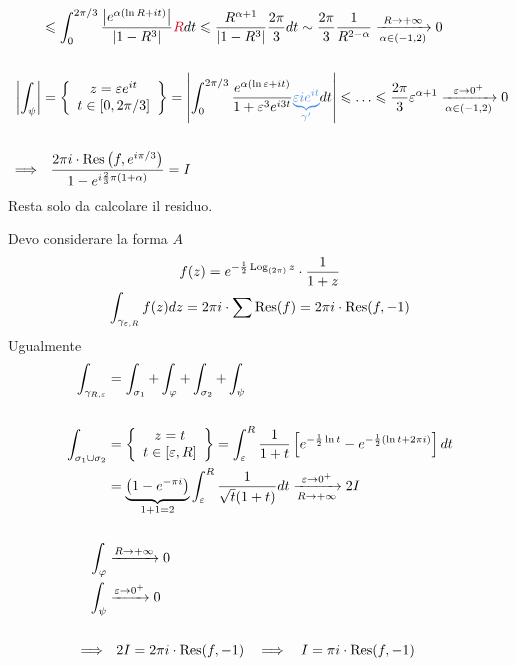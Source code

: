 \begin{equation*}
\begin{aligned}
 & \leqslant \int ^{2\pi /3}_{0}\frac{\left| e^{\alpha (\ln R + it)}\right| }{\left| 1 - R^{3}\right| }\textcolor[rgb]{0.82,0.01,0.11}{R} dt\leqslant \frac{R^{\alpha + 1}}{\left| 1 - R^{3}\right| }\frac{2\pi }{3} dt\sim \frac{2\pi }{3}\frac{1}{R^{2 - \alpha }}\xrightarrow[\alpha \in (- 1,2)]{R\rightarrow + \infty } 0\\
 & \\
\left| \int _{\psi }\right|  & = \left\{\begin{array}{ c }
z = \varepsilon e^{it}\\
t\in [ 0,2\pi /3]
\end{array}\right\} = \left| \int ^{2\pi /3}_{0}\frac{e^{\alpha (\ln \varepsilon + it)}}{1 + \varepsilon ^{3} e^{i3t}}\textcolor[rgb]{0.29,0.56,0.89}{\underbrace{\varepsilon ie^{it}}_{\gamma '}} dt\right| \leqslant \dotsc \leqslant \frac{2\pi }{3} \varepsilon ^{\alpha + 1}\xrightarrow[\alpha \in (- 1,2)]{\varepsilon \rightarrow 0^{ + }} 0\\
 & \\
\implies  & \ \ \frac{2\pi i\cdot \Res \left(f,e^{i\pi /3}\right)}{1 - e^{i\frac{2}{3} \pi (1 + \alpha)}} = I
\end{aligned}
\end{equation*}
Resta solo da calcolare il residuo.
\Soluzione

Devo considerare la forma $A$
\begin{gather*}
f(z) = e^{ - \frac{1}{2}\operatorname{Log}_{(2\pi)} z} \cdot \frac{1}{1 + z}\\
\int _{\gamma _{\varepsilon ,R}} f(z) dz = 2\pi i\cdot \sum \operatorname{Res} (f) = 2\pi i\cdot \operatorname{Res} (f, - 1)
\end{gather*}
Ugualmente
\begin{equation*}
\begin{aligned}
\int _{\gamma _{R,\varepsilon }} & = \int _{\sigma _{1}} + \int _{\varphi } + \int _{\sigma _{2}} + \int _{\psi }\\
 & \\
\int _{\sigma _{1} \cup \sigma _{2}} & = \left\{\begin{array}{ c }
z = t\\
t\in [ \varepsilon ,R]
\end{array}\right\} = \int ^{R}_{\varepsilon }\frac{1}{1 + t}\left[ e^{ - \frac{1}{2}\ln t} - e^{ - \frac{1}{2}(\ln t + 2\pi i)}\right] dt\\
 & = \underbrace{\left(1 - e^{ - \pi i}\right)}_{1 + 1 = 2}\int ^{R}_{\varepsilon }\frac{1}{\sqrt{t}(1 + t)} dt\xrightarrow[R\rightarrow + \infty ]{\varepsilon \rightarrow 0^{ + }} 2I\\
 & \\
\int _{\varphi } & \xrightarrow{R\rightarrow + \infty } 0\\
\int _{\psi } & \xrightarrow{\varepsilon \rightarrow 0^{ + }} 0\\
 & \\
\implies  & \ \ 2I = 2\pi i\cdot \operatorname{Res} (f, - 1) \ \ \implies \ \ I = \pi i\cdot \operatorname{Res} (f, - 1)
\end{aligned}
\end{equation*}
\Soluzione


